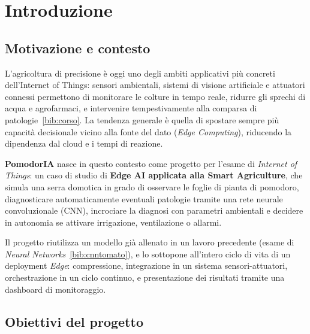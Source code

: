 \section{Introduzione}
\label{sec:introduzione}

\subsection{Motivazione e contesto}

L'agricoltura di precisione è oggi uno degli ambiti applicativi più concreti
dell'Internet of Things: sensori ambientali, sistemi di visione artificiale
e attuatori connessi permettono di monitorare le colture in tempo reale,
ridurre gli sprechi di acqua e agrofarmaci, e intervenire tempestivamente
alla comparsa di patologie~\ref{bib:corso}. La tendenza generale è quella
di spostare sempre più capacità decisionale vicino alla fonte del dato
(\emph{Edge Computing}), riducendo la dipendenza dal cloud e i tempi di
reazione.

\textbf{PomodorIA} nasce in questo contesto come progetto per l'esame di
\emph{Internet of Things}: un caso di studio di \textbf{Edge AI applicata
alla Smart Agriculture}, che simula una serra domotica in grado di
osservare le foglie di pianta di pomodoro, diagnosticare automaticamente
eventuali patologie tramite una rete neurale convoluzionale (CNN),
incrociare la diagnosi con parametri ambientali e decidere in autonomia se
attivare irrigazione, ventilazione o allarmi.

Il progetto riutilizza un modello già allenato in un lavoro precedente
(esame di \emph{Neural Networks}~\ref{bib:cnntomato}), e lo sottopone
all'intero ciclo di vita di un deployment \emph{Edge}: compressione,
integrazione in un sistema sensori-attuatori, orchestrazione in un ciclo
continuo, e presentazione dei risultati tramite una dashboard di
monitoraggio.

\subsection{Obiettivi del progetto}

